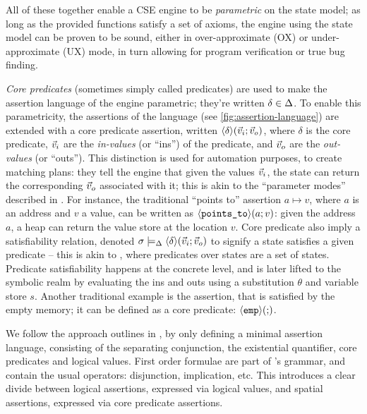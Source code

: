 All of these together enable a CSE engine to be \emph{parametric} on the state model; as long as the provided functions satisfy a set of axioms, the engine using the state model can be proven to be sound, either in over-approximate (OX) or under-approximate (UX) mode, in turn allowing for program verification or true bug finding.

\emph{Core predicates} (sometimes simply called predicates) are used to make the assertion language of the engine parametric; they're written ${\delta\in\Delta}$. To enable this parametricity, the assertions of the language (see \autoref{fig:assertion-language}) are extended with a core predicate assertion, written $\left<\delta\right>\!(\vec{v}_i;\vec{v}_o)$, where $\delta$ is the core predicate, $\vec{v}_i$ are the \emph{in-values} (or ``ins'') of the predicate, and $\vec{v}_o$ are the \emph{out-values} (or ``outs''). This distinction is used for automation purposes, to create matching plans: they tell the engine that given the values $\vec{v}_i$, the state can return the corresponding $\vec{v}_o$ associated with it; this is akin to the ``parameter modes'' described in \cite{parametermodes}. For instance, the traditional ``points to'' assertion $a \mapsto v$, where $a$ is an address and $v$ a value, can be written as $\left<\texttt{points\_to}\right>\!(a;v)$: given the address $a$, a heap can return the value store at the location $v$. Core predicate also imply a satisfiability relation, denoted $\sigma\models_{\Delta}\left<\delta\right>\!(\vec{v}_i;\vec{v}_o)$ to signify a state satisfies a given predicate -- this is akin to \cite{abstractseplogic,localreasoning}, where predicates over states are a set of states. Predicate satisfiability happens at the concrete level, and is later lifted to the symbolic realm by evaluating the ins and outs using a substitution $\theta$ and variable store $s$. Another traditional example is the \emp{} assertion, that is satisfied by the empty memory; it can be defined as a core predicate: $\left<\texttt{emp}\right>\!(;\!)$.

\begin{remark}
We follow the approach outlines in \cite{sacha-phd}, by only defining a minimal assertion language, consisting of the separating conjunction, the existential quantifier, core predicates and logical values. First order formulae are part of \LVal's grammar, and contain the usual operators: disjunction, implication, etc. This introduces a clear divide between logical assertions, expressed via logical values, and spatial assertions, expressed via core predicate assertions.
\end{remark}

